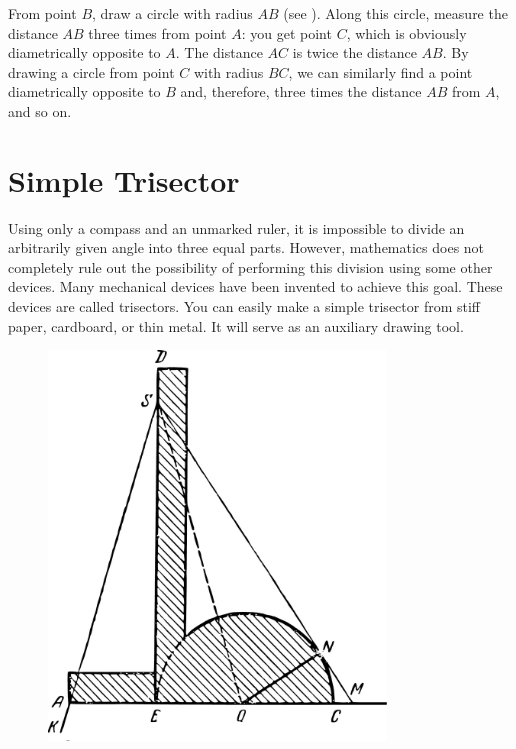 \ans From point $B$, draw a circle with radius $AB$ (see ). Along this circle, measure the distance $AB$ three times from point $A$: you get point $C$, which is obviously diametrically opposite to $A$. The distance $AC$ is twice the distance $AB$. By drawing a circle from point $C$ with radius $BC$, we can similarly find a point diametrically opposite to $B$ and, therefore, three times the distance $AB$ from $A$, and so on.


\section{Simple Trisector}
\label{sec-10.4}

Using only a compass and an unmarked ruler, it is impossible to divide an arbitrarily given angle into three equal parts. However, mathematics does not completely rule out the possibility of performing this division using some other devices. Many mechanical devices have been invented to achieve this goal. These devices are called trisectors. You can easily make a simple trisector from stiff paper, cardboard, or thin metal. It will serve as an auxiliary drawing tool.


\begin{figure}[h!]
\centering
\includegraphics[width=0.8\textwidth]{figures/ch-10/fig-147.pdf}
\end{figure}


